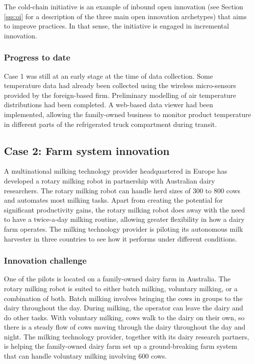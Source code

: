 The cold-chain initiative is an example of inbound open innovation (see Section \ref{sss:oi} for a description of the three main open innovation archetypes) that aims to improve practices. In that sense, the initiative is engaged in incremental innovation. 

\subsubsection{Progress to date}

Case 1 was still at an early stage at the time of data collection. Some temperature data had already been collected using the wireless micro-sensors provided by the foreign-based firm. Preliminary modelling of air temperature distributions had been completed. A web-based data viewer had been implemented, allowing the family-owned business to monitor product temperature in different parts of the refrigerated truck compartment during transit. \medskip

\subsection{Case 2: Farm system innovation}

A multinational milking technology provider headquartered in Europe has developed a rotary milking robot in partnership with Australian dairy researchers. The rotary milking robot can handle herd sizes of 300 to 800 cows and automates most milking tasks. Apart from creating the potential for significant productivity gains, the rotary milking robot does away with the need to have a twice-a-day milking routine, allowing greater flexibility in how a dairy farm operates. The milking technology provider is piloting its autonomous milk harvester in three countries to see how it performs under different conditions. 

\subsubsection{Innovation challenge}

One of the pilots is located on a family-owned dairy farm in Australia. The rotary milking robot is suited to either batch milking, voluntary milking, or a combination of both. Batch milking involves bringing the cows in groups to the dairy throughout the day. During milking, the operator can leave the dairy and do other tasks. With voluntary milking, cows walk to the dairy on their own, so there is a steady flow of cows moving through the dairy throughout the day and night. The milking technology provider, together with its dairy research partners, is helping the family-owned dairy farm set up a ground-breaking farm system that can handle voluntary milking involving 600 cows. \medskip

